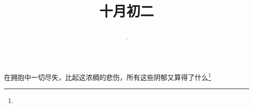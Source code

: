 \title{\date[d=2,m=11,y=2024][year:cn-y,年,month:cn,day:cn,日,·,weekday]·十月初二 }
在拥抱中一切尽失，比起这浓稠的悲伤，所有这些阴郁又算得了什么\footnote{ }

